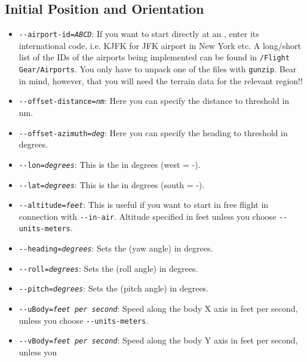 \subsection{Initial Position and Orientation\label{aiportid}}
\begin{itemize}
\item{\texttt{-$ $-airport-id={\it ABCD}}}: If you want to start directly at an ,
  enter its international code, i.e. KJFK for JFK airport in New York etc.
  A long/short list of the IDs of the airports being implemented can
  be found in \texttt{/Flight Gear/Airports}. You only have to unpack
  one of the files with \texttt{gunzip}. Bear in mind, however, that you will need the terrain data for the relevant region!!
\item{\texttt{-$ $-offset-distance={\it nm}}}: Here you can specify the distance to
threshold in nm.
\item{\texttt{-$ $-offset-azimuth={\it deg}}}: Here you can specify the heading to
threshold in degrees.
\item{\texttt{-$ $-lon={\it degrees}}}: This is the  in degrees (west =
-).
\item{\texttt{-$ $-lat={\it degrees}}}: This is the  in degrees (south =
-).
\item{\texttt{-$ $-altitude={\it feet}}}: This is useful if you want to start in free
flight in connection with \texttt{-$ $-in-air}. Altitude specified in feet unless you
choose \texttt{-$ $-units-meters}.
\item{\texttt{-$ $-heading={\it degrees}}}: Sets the  (yaw angle) in degrees.
\item{\texttt{-$ $-roll={\it degrees}}}: Sets the  (roll angle) in degrees.
\item{\texttt{-$ $-pitch={\it degrees}}}: Sets the  (pitch angle) in degrees.
\item{\texttt{-$ $-uBody={\it feet per second}}}: Speed along the body X axis in feet per second, unless you
choose \texttt{-$ $-units-meters}.
\item{\texttt{-$ $-vBody={\it feet per second}}}: Speed along the body Y axis in feet per second, unless you

\end{itemize}

